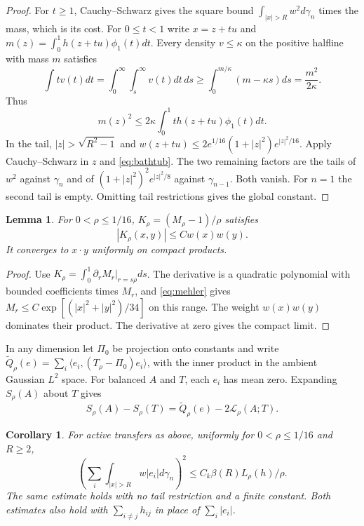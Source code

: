 \documentclass[11pt,reqno]{amsart}
\newtheorem{lemma}[theorem]{Lemma}
\newtheorem{corollary}[theorem]{Corollary}
\newcommand{\ga}{\gamma}
\newcommand{\LL}{\mathcal L}
\begin{document}
\begin{proof}
For $t\ge1$, Cauchy--Schwarz gives the square bound
$\int_{|x|>R}w^2d\ga_n$ times the mass, which is its cost.
For $0\le t<1$ write $x=z+tu$ and
$m(z)=\int_0^1h(z+tu)\phi_1(t)dt$.
Every density $v\le\kappa$ on the positive halfline with mass $m$
satisfies
\[
 \int tv(t)dt=\int_0^\infty\int_s^\infty v(t)dt\,ds
 \ge\int_0^{m/\kappa}(m-\kappa s)ds=\frac{m^2}{2\kappa}.
\]
Thus
\begin{equation}\label{eq:bathtub}
 m(z)^2\le2\kappa\int_0^1t h(z+tu)\phi_1(t)dt.
\end{equation}
In the tail, $|z|>\sqrt{R^2-1}$ and
$w(z+tu)\le2e^{1/16}(1+|z|^2)e^{|z|^2/16}$.
Apply Cauchy--Schwarz in $z$ and \eqref{eq:bathtub}.
The two remaining factors are the tails of $w^2$ against $\ga_n$ and
of $(1+|z|^2)^2e^{|z|^2/8}$ against $\ga_{n-1}$. Both vanish.
For $n=1$ the second tail is empty. Omitting tail restrictions gives
the global constant.
\end{proof}

\begin{lemma}\label{lem:kernel}
For $0<\rho\le1/16$, $K_\rho=(M_\rho-1)/\rho$ satisfies
\begin{equation}\label{eq:kernel-weight}
 |K_\rho(x,y)|\le Cw(x)w(y).
\end{equation}
It converges to $x\cdot y$ uniformly on compact products.
\end{lemma}

\begin{proof}
Use $K_\rho=\int_0^1\partial_rM_r|_{r=s\rho}ds$.
The derivative is a quadratic polynomial with bounded coefficients
times $M_r$, and \eqref{eq:mehler} gives
$M_r\le C\exp[(|x|^2+|y|^2)/34]$ on this range.
The weight $w(x)w(y)$ dominates their product. The derivative at zero
gives the compact limit.
\end{proof}

In any dimension let $\Pi_0$ be projection onto constants and write
$\widetilde Q_\rho(e)=\sum_i\langle e_i,(T_\rho-\Pi_0)e_i\rangle$,
with the inner product in the ambient Gaussian $L^2$ space.
For balanced $A$ and $T$, each $e_i$ has mean zero.
Expanding $S_\rho(A)$ about $T$ gives
\begin{equation}\label{eq:comparison}
 S_\rho(A)-S_\rho(T)=\widetilde Q_\rho(e)-2\LL_\rho(A;T).
\end{equation}

\begin{corollary}\label{cor:exterior}
For active transfers as above, uniformly for $0<\rho\le1/16$ and $R\ge2$,
\begin{equation}\label{eq:tv-tail}
 \left(\sum_i\int_{|x|>R}w|e_i|d\ga_n\right)^2
 \le C_k\beta(R)L_\rho(h)/\rho.
\end{equation}
The same estimate holds with no tail restriction and a finite
constant. Both estimates also hold with $\sum_{i\ne j}h_{ij}$
in place of $\sum_i|e_i|$.
\end{corollary}
\end{document}
